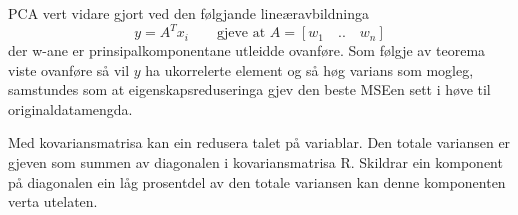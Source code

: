 \documentclass[oneside, nynorsk]{book}
\begin{document}
PCA vert vidare gjort ved den følgjande lineæravbildninga
\[y=A^Tx_i \qquad \text{gjeve at $A=[w_1 \quad .. \quad w_n]$}\]
der w-ane er prinsipalkomponentane utleidde ovanføre.
Som følgje av teorema viste ovanføre så vil $y$ ha ukorrelerte element og så høg varians som mogleg,
samstundes som at eigenskapsreduseringa gjev den beste MSEen sett i høve til originaldatamengda.

Med kovariansmatrisa kan ein redusera talet på variablar. Den totale variansen er gjeven som summen av diagonalen i kovariansmatrisa R.
Skildrar ein komponent på diagonalen ein låg prosentdel av den totale variansen kan denne komponenten verta utelaten.

\end{document}
